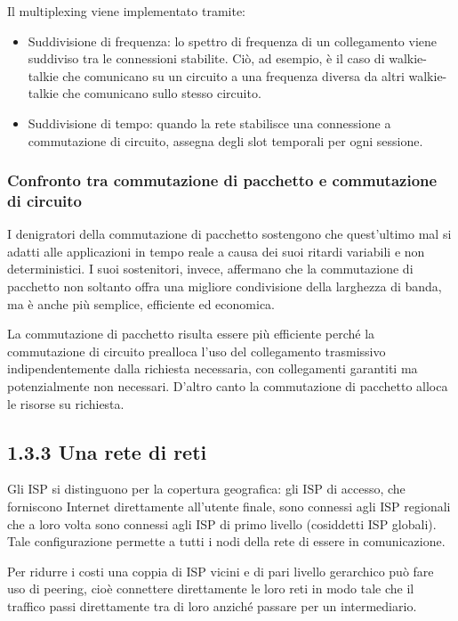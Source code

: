 \documentclass{book}
\begin{document}
Il multiplexing viene implementato tramite:
	
\begin{itemize}
	\item Suddivisione di frequenza: lo spettro di frequenza di un collegamento viene suddiviso tra le connessioni stabilite. Ciò, ad esempio, è il caso di walkie-talkie che comunicano su un circuito a una frequenza diversa da altri walkie-talkie che comunicano sullo stesso circuito.
	\item Suddivisione di tempo: quando la rete stabilisce una connessione a commutazione di circuito, assegna degli slot temporali per ogni sessione.
\end{itemize}

\subsubsection{Confronto tra commutazione di pacchetto e commutazione di circuito}
I denigratori della commutazione di pacchetto sostengono che quest'ultimo mal si adatti alle applicazioni in tempo reale a causa dei suoi ritardi variabili e non deterministici. I suoi sostenitori, invece, affermano che la commutazione di pacchetto non soltanto offra una migliore condivisione della larghezza di banda, ma è anche più semplice, efficiente ed economica.
	
La commutazione di pacchetto risulta essere più efficiente perché la commutazione di circuito prealloca l'uso del collegamento trasmissivo indipendentemente dalla richiesta necessaria, con collegamenti garantiti ma potenzialmente non necessari. D'altro canto la commutazione di pacchetto alloca le risorse su richiesta.
	
\subsection*{1.3.3 Una rete di reti}
Gli ISP si distinguono per la copertura geografica: gli ISP di accesso, che forniscono Internet direttamente all'utente finale, sono connessi agli ISP regionali che a loro volta sono connessi agli ISP di primo livello (cosiddetti ISP globali). Tale configurazione permette a tutti i nodi della rete di essere in comunicazione.
	
Per ridurre i costi una coppia di ISP vicini e di pari livello gerarchico può fare uso di peering, cioè connettere direttamente le loro reti in modo tale che il traffico passi direttamente tra di loro anziché passare per un intermediario.
	
\end{document}
